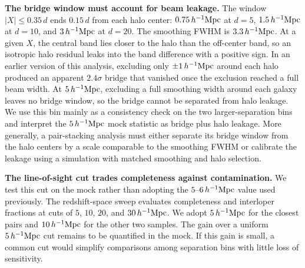 \documentclass[preprint]{aastex701}
\newcommand{\hinvMpc}{h^{-1}{\rm Mpc}}
\begin{document}
\textbf{The bridge window must account for beam leakage.} The window
$|X|\leq0.35\,d$ ends $0.15\,d$ from each halo center: $0.75\,\hinvMpc$ at
$d=5$, $1.5\,\hinvMpc$ at $d=10$, and $3\,\hinvMpc$ at $d=20$. The smoothing
FWHM is $3.3\,\hinvMpc$. At a given $X$, the central band lies closer to the
halo than the off-center band, so an isotropic
halo residual leaks into the band difference with a positive sign. In an
earlier version of this analysis, excluding only $\pm1\,\hinvMpc$ around
each halo produced an apparent $2.4\sigma$ bridge that vanished once the
exclusion reached a full beam width. %
At $5\,\hinvMpc$, excluding a full smoothing width around each galaxy leaves
no bridge window, so the bridge cannot be separated from halo leakage. We use
this bin mainly as a consistency check on the two larger-separation bins and
interpret the $5\,\hinvMpc$ mock statistic as bridge plus halo leakage.
More generally, a pair-stacking analysis must either separate its bridge
window from the halo centers by a scale comparable to the smoothing FWHM or
calibrate the leakage using a simulation with matched smoothing and halo
selection.

\textbf{The line-of-sight cut trades completeness against contamination.}
We test this cut on the mock rather than adopting the
$5$--$6\,\hinvMpc$ value used previously. The redshift-space sweep evaluates
completeness and interloper fractions at cuts of $5$, $10$, $20$, and
$30\,\hinvMpc$.
We adopt
$5\,\hinvMpc$ for the closest pairs and $10\,\hinvMpc$ for the other two
samples.
The gain over a uniform $5\,\hinvMpc$ cut remains to be quantified in the
mock. %
If this gain is small, a common cut would simplify comparisons
among separation bins with little loss of sensitivity.


{}

\end{document}

